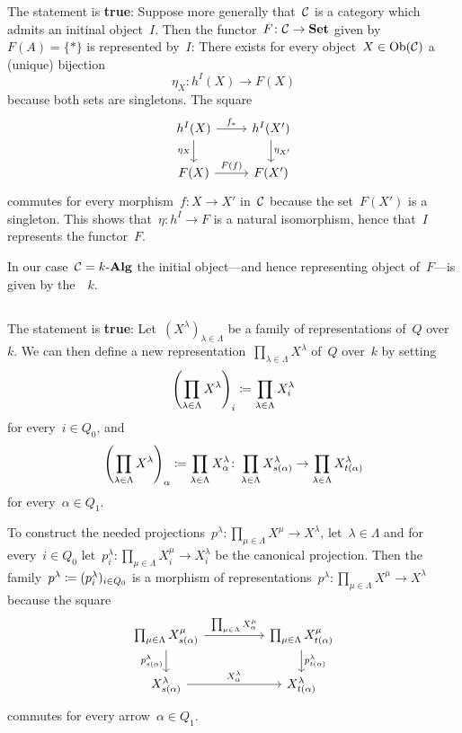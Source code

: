 The statement is \textbf{true}:
Suppose more generally that~$\mathcal{C}$ is a category which admits an initinal object~$I$.
Then the functor~$F \colon \mathcal{C} \to \mathbf{Set}$ given by~$F(A) = \{\ast\}$ is represented by~$I$:
There exists for every object~$X \in \operatorname{Ob}(\mathcal{C})$ a (unique) bijection
\[
          \eta_X
  \colon  h^I(X)
  \to     F(X)
\]
because both sets are singletons.
The square
\[
  \begin{tikzcd}
      h^I(X)
      \arrow{r}[above]{f_*}
      \arrow{d}[left]{\eta_X}
    & h^I(X')
      \arrow{d}[right]{\eta_{X'}}
    \\
      F(X)
      \arrow{r}[above]{F(f)}
    & F(X')
  \end{tikzcd}
\]
commutes for every morphism~$f \colon X \to X'$ in~$\mathcal{C}$ because the set~$F(X')$ is a singleton.
This shows that~$\eta \colon h^I \to F$ is a natural isomorphism, hence that~$I$ represents the functor~$F$.

In our case~$\mathcal{C} = \text{$k$-$\mathbf{Alg}$}$ the initial object---and hence representing object of~$F$---is given by the~{\kalg}~$k$.





\subsection{}

The statement is \textbf{true}:
Let~$(X^\lambda)_{\lambda \in \Lambda}$ be a family of representations of~$Q$ over~$k$.
We can then define a new representation~$\prod_{\lambda \in \Lambda} X^\lambda$ of~$Q$ over~$k$ by setting
\[
            \left( \prod_{\lambda \in \Lambda} X^\lambda \right)_i
  \coloneqq  \prod_{\lambda \in \Lambda} X^\lambda_i
\]
for every~$i \in Q_0$, and
\[
            \left( \prod_{\lambda \in \Lambda} X^\lambda \right)_\alpha
  \coloneqq  \prod_{\lambda \in \Lambda} X^\lambda_\alpha
  \colon    \prod_{\lambda \in \Lambda} X^\lambda_{s(\alpha)}
  \to       \prod_{\lambda \in \Lambda} X^\lambda_{t(\alpha)}
\]
for every~$\alpha \in Q_1$.

To construct the needed projections~$p^\lambda \colon \prod_{\mu \in \Lambda} X^\mu \to X^\lambda$, let~$\lambda \in \Lambda$ and for every~$i \in Q_0$ let~$p^\lambda_i \colon \prod_{\mu \in \Lambda} X^\mu_i \to X^\lambda_i$ be the canonical projection.
Then the family~$p^\lambda \coloneqq (p^\lambda_i)_{i \in Q_0}$ is a morphism of representations~$p^\lambda \colon \prod_{\mu \in \Lambda} X^\mu \to X^\lambda$ because the square
\[
  \begin{tikzcd}[column sep = huge]
      \prod_{\mu \in \Lambda} X^\mu_{s(\alpha)}
      \arrow{r}[above]{\prod_{\mu \in \Lambda} X^\mu_\alpha}
      \arrow{d}[left]{p^\lambda_{s(\alpha)}}
    & \prod_{\mu \in \Lambda} X^\mu_{t(\alpha)}
      \arrow{d}[right]{p^\lambda_{t(\alpha)}}
    \\
      X^\lambda_{s(\alpha)}
      \arrow{r}[above]{X^\lambda_\alpha}
    & X^\lambda_{t(\alpha)}
  \end{tikzcd}
\]
commutes for every arrow~$\alpha \in Q_1$.


